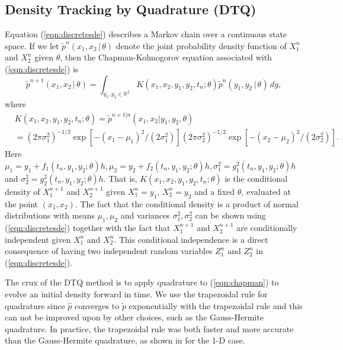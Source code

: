 \documentclass[graybox]{svmult}
\begin{document}
\subsection{Density Tracking by Quadrature (DTQ)}
\label{subsec:2-1}
Equation (\ref{eqn:discretesde}) describes a Markov chain over a continuous state space.  If we let $\widetilde{p}^n(x_1,x_2 \, | \, \theta)$ denote the joint probability density function of $X_1^n$ and $X_2^n$ given $\theta$, then the Chapman-Kolmogorov equation associated with (\ref{eqn:discretesde})  is
\begin{equation}
\label{eqn:chapman}
\widetilde{p}^{n+1}(x_1,x_2 \, | \, \theta) = \int_{y_1,y_2 \in \mathbb{R}^2} K(x_1,x_2,y_1,y_2,t_n; \theta) \widetilde{p}^n(y_1,y_2 \, | \, \theta) \, dy,
\end{equation}
where
\begin{align}
&K(x_1,x_2,y_1,y_2,t_n; \theta) = \widetilde{p}^{{n+1} | {n}}(x_1,x_2 | y_1,y_2,\theta) \nonumber\\
&= (2 \pi \sigma_1^2)^{-1/2} \exp \left[ -(x_1 - \mu_1)^2/(2 \sigma_1^2) \right] (2 \pi \sigma_2^2)^{-1/2} \exp \left[ -(x_2 - \mu_2)^2/(2 \sigma_2^2) \right]\nonumber.
\end{align}
Here $\mu_1 = y_1 + f_1(t_n,y_1,y_2; \theta) h,  \mu_2 = y_2 + f_2(t_n,y_1,y_2; \theta) h,  \sigma_1^2 = g_1^2(t_n,y_1,y_2; \theta) h$ and  $\sigma_2^2 = g_2^2(t_n,y_1,y_2; \theta) h$. That is, $K(x_1,x_2,y_1,y_2,t_n; \theta)$ is the conditional density of $X_1^{n+1}$ and $X_2^{n+1}$ given $X_1^n = y_1$, $X_2^n = y_2$ and a fixed $\theta$, evaluated at the point $(x_1,x_2)$.  The fact that the conditional density is a product of normal distributions with means $\mu_1, \mu_2$ and variances $\sigma_1^2, \sigma_2^2$ can be shown using (\ref{eqn:discretesde}) together with the fact that $X_1^{n+1}$ and $X_2^{n+1}$ are conditionally independent given $X_1^n$ and $X_2^n$. This conditional independence is a direct consequence of having two independent random variables $Z_1^n$ and $Z_2^n$ in (\ref{eqn:discretesde}).

The crux of the DTQ method is to apply quadrature to (\ref{eqn:chapman}) to evolve an initial density forward in time. We use the trapezoidal rule for quadrature since $\hat{p}$ converges to $\tilde{p}$ exponentially with the trapezoidal rule and this can not be improved upon by other choices, such as the Gauss-Hermite quadrature. In practice, the trapezoidal rule was both faster and more accurate than the Gauss-Hermite quadrature, as shown in \cite{BhatMadu2016} for the 1-D case.
\end{document}
